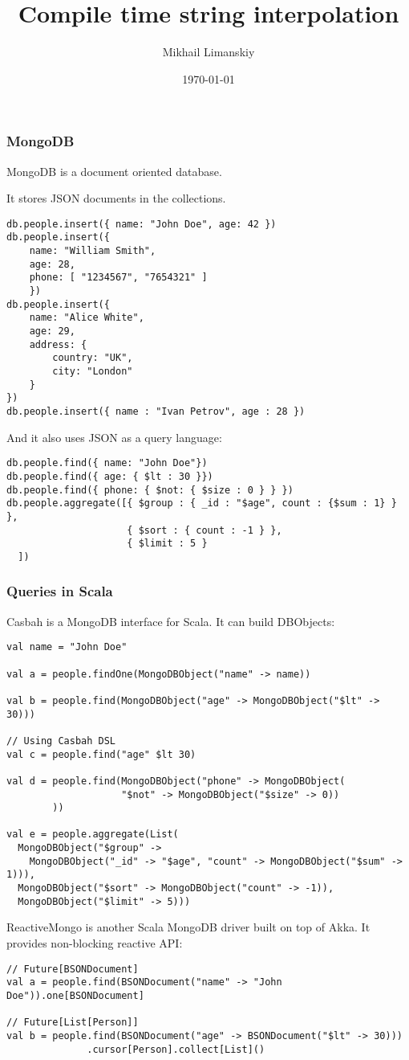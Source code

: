 \documentclass[t]{beamer}
\title{Compile time string interpolation}
\author{Mikhail Limanskiy}
\institute{SymphonyTeleca}
\date{\today}
\begin{document}
\begin{frame}
    \titlepage
\end{frame}

\begin{frame}[fragile]
\frametitle{MongoDB}
MongoDB is a document oriented database.

It stores JSON documents in the collections.
\begin{lstlisting}
db.people.insert({ name: "John Doe", age: 42 })
db.people.insert({ 
    name: "William Smith",
    age: 28,
    phone: [ "1234567", "7654321" ]
    })
db.people.insert({
    name: "Alice White",
    age: 29,
    address: {
        country: "UK",
        city: "London"
    }
})
db.people.insert({ name : "Ivan Petrov", age : 28 })
\end{lstlisting}

And it also uses JSON as a query language:
\begin{lstlisting}
db.people.find({ name: "John Doe"})
db.people.find({ age: { $lt : 30 }})
db.people.find({ phone: { $not: { $size : 0 } } })
db.people.aggregate([{ $group : { _id : "$age", count : {$sum : 1} } },
                     { $sort : { count : -1 } },
                     { $limit : 5 }
  ])
\end{lstlisting}
\end{frame}

\begin{frame}[fragile]
\frametitle{Queries in Scala}
Casbah is a MongoDB interface for Scala.  It can build DBObjects:

\begin{lstlisting}
val name = "John Doe"

val a = people.findOne(MongoDBObject("name" -> name))

val b = people.find(MongoDBObject("age" -> MongoDBObject("$lt" -> 30)))

// Using Casbah DSL
val c = people.find("age" $lt 30)

val d = people.find(MongoDBObject("phone" -> MongoDBObject(
                    "$not" -> MongoDBObject("$size" -> 0))
        ))

val e = people.aggregate(List(
  MongoDBObject("$group" ->
    MongoDBObject("_id" -> "$age", "count" -> MongoDBObject("$sum" -> 1))),
  MongoDBObject("$sort" -> MongoDBObject("count" -> -1)),
  MongoDBObject("$limit" -> 5)))
\end{lstlisting}

ReactiveMongo is another Scala MongoDB driver built on top of Akka.  It provides
non-blocking reactive API:

\begin{lstlisting}
// Future[BSONDocument]
val a = people.find(BSONDocument("name" -> "John Doe")).one[BSONDocument]

// Future[List[Person]]
val b = people.find(BSONDocument("age" -> BSONDocument("$lt" -> 30)))
              .cursor[Person].collect[List]()
\end{lstlisting}
\end{frame}
\end{document}
